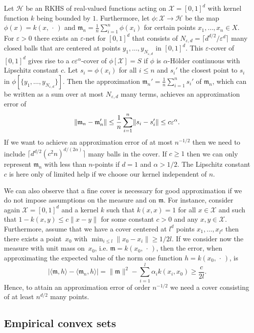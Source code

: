\documentclass[10pt]{amsart}
\theoremstyle{definition}\newtheorem{defi}[theo]{Definition}\newtheorem{rema}[theo]{Remark}\newtheorem{exam}[theo]{Example}\newtheorem{exem}[theo]{Example}\newtheorem{nota}[theo]{Notation}
\theoremstyle{remark}
\newcommand{\X}{\mathcal{X}}
\newcommand{\cH}{\mathcal{H}}
\newcommand{\mean}{\mathfrak{m}}
\let\originalleft\left
\let\originalright\right
\renewcommand{\left}{\mathopen{}\mathclose\bgroup\originalleft}
\renewcommand{\right}{\aftergroup\egroup\originalright}
\begin{document}
Let $\cH$ be an RKHS of real-valued functions acting on $\X= [0,1]^d$ with kernel function $k$ being bounded by $1$. Furthermore, let $\phi:\X \rightarrow \cH$ be the map $\phi(x) = k(x,\,\cdot\,)$ and $\mean_n = \frac{1}{n} \sum_{i=1}^n \phi(x_i)$ for certain points $x_1,\dots, x_n \in X$. For $\varepsilon >0$ there exists an $\varepsilon$-net for $[0,1]^d$ that consists of $N_{\varepsilon,d} = \lceil d^{d/2}/\varepsilon^d\rceil$ many closed balls that are centered at points $y_1,\dots, y_{N_{\varepsilon,d}}$ in $[0,1]^d$. This $\varepsilon$-cover of $[0,1]^d$ gives rise to a $c \varepsilon^\alpha$-cover of $\phi[\X] = S$ if $\phi$ is $\alpha$-H\"older continuous with Lipschitz constant $c$. Let $s_i = \phi(x_i)$ for all $i\leq n$ and $s_i'$ the closest point to $s_i$ in $\phi[\{y_1,\dots,y_{N_{\varepsilon,d}}\}]$. Then the approximation $\mean_n' = \frac{1}{n} \sum_{i=1}^n s_i'$ of $\mean_n$, which can be written as a sum over at most $N_{\varepsilon,d}$ many terms, achieves an approximation error of
\[
\left\|\mean_n - \mean_n'\right\| \leq \frac{1}{n} \sum_{i=1}^n \left\|s_i - s_i'\right\| \leq c \varepsilon^\alpha.
\]
If we want to achieve an approximation error of at most $n^{-1/2}$ then we need to include $\lceil d^{d/2} (c^2n)^{d/(2\alpha)} \rceil$ many balls in the cover. If $c\geq 1$ then we can only represent $\mean_n$ with less than $n$-points if $d=1$ and $\alpha > 1/2$. The Lipschitz constant $c$ is here only of limited help if we choose our kernel independent of $n$.


We can also observe that a fine cover is necessary for good approximation if we do not impose assumptions on the measure and on $\mean$. For instance, consider again $\X=[0,1]^d$ and a kernel $k$ such that $k(x,x) = 1$ for all $x\in \X$ and such that $1 - k(x,y) \leq c\|x-y\|$ for some constant $c>0$ and any $x,y \in \X$. Furthermore, assume that we have a cover centered at $l^d$ points $x_1,\dots,x_{l^d}$ then there exists a point~$x_0$ with $\min_{i\leq l} \|x_0 - x_i\| \geq 1/2l$. If we consider now the measure with unit mass on~$x_0$, i.e. $\mean = k(x_0,\,\cdot\,)$, then the error, when approximating the expected value of the norm one function $h = k(x_0,\,\cdot\,)$, is
\[
|\langle \mean, h \rangle - \langle \mean_n, h\rangle| = \|\mean\|^2 -
\sum_{i=1}^l \alpha_i k(x_i,x_0) \geq \frac{c}{2l}.
\]
Hence, to attain an approximation error of order $n^{-1/2}$ we need a cover consisting of at least $n^{d/2}$ many points.



\subsection{Empirical convex sets} \label{sec:emp_convex_sets}
\end{document}

